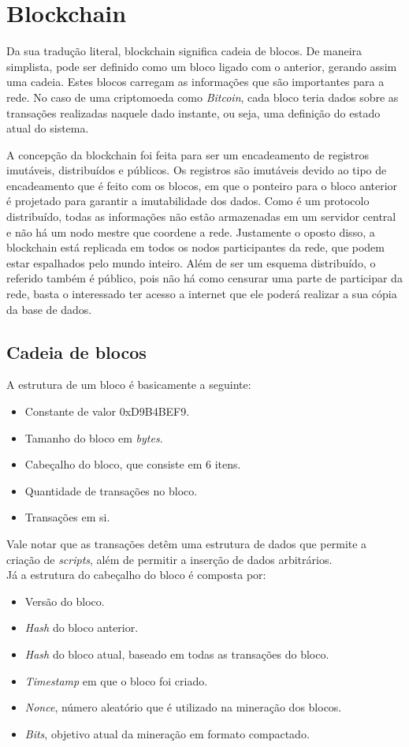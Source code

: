 \documentclass{ufsctex/ufsctex}
\begin{document}
\section{Blockchain}

Da sua tradução literal, blockchain significa cadeia de blocos. De  maneira
simplista, pode ser definido como um bloco ligado com o anterior, gerando assim
uma cadeia. Estes blocos carregam as informações que são importantes para a
rede. No caso de uma criptomoeda como \textit{Bitcoin}, cada bloco teria dados
sobre as transações realizadas naquele dado instante, ou seja, uma definição do
estado atual do sistema.

A concepção da blockchain foi feita para ser um encadeamento de registros
imutáveis, distribuídos e públicos. Os registros são imutáveis devido ao tipo de
encadeamento que é feito com os blocos, em que o ponteiro para o bloco anterior
é projetado para garantir a imutabilidade dos dados. Como é um protocolo
distribuído, todas as informações não estão armazenadas em um servidor central e
não há um nodo mestre que coordene a rede. Justamente o oposto disso, a
blockchain está replicada em todos os nodos participantes da rede, que podem
estar espalhados pelo mundo inteiro. Além de ser um esquema distribuído, o
referido também é público, pois não há como censurar uma parte de participar da
rede, basta o interessado ter acesso a internet que ele poderá realizar a sua
cópia da base de dados.\cite{blockchain}

\subsection{Cadeia de blocos}

A estrutura de um bloco é basicamente a seguinte:
\begin{itemize}
	\item Constante de valor 0xD9B4BEF9.
	\item Tamanho do bloco em \textit{bytes}.
	\item Cabeçalho do bloco, que consiste em 6 itens.
	\item Quantidade de transações no bloco.
	\item Transações em si.
\end{itemize}

Vale notar que as transações detêm uma estrutura de dados que permite a criação
de \textit{scripts}, além de permitir a inserção de dados arbitrários. \\

Já a estrutura do cabeçalho do bloco é composta por:
\begin{itemize}
	\item Versão do bloco.
	\item \textit{Hash} do bloco anterior.
	\item \textit{Hash} do bloco atual, baseado em todas as transações do bloco.
	\item \textit{Timestamp} em que o bloco foi criado.
	\item \textit{Nonce}, número aleatório que é utilizado na mineração dos blocos.
	\item \textit{Bits}, objetivo atual da mineração em formato compactado.
\end{itemize}
\end{document}

